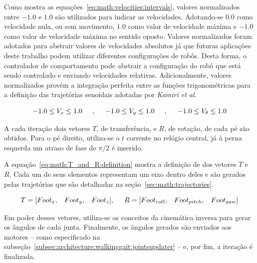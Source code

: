 Como mostra as equações~\ref{eq:math:velocities:intervals}, valores normalizados entre $-1.0$ e $1.0$ são utilizados para indicar as velocidades. Adotando-se $0.0$ como velocidade nula, ou sem movimento, $1.0$ como valor de velocidade máxima e $-1.0$ como valor de velocidade máxima no sentido oposto. Valores normalizados foram adotados para abstrair valores de velocidades absolutos já que futuras aplicações deste trabalho podem utilizar diferentes configurações de robôs. Desta forma, o controlador de comportamento pode abstrair a configuração do robô que está sendo controlado e enviando velocidades relativas. Adicionalmente, valores normalizados provém a integração perfeita entre as funções trigonométricas para a definição das trajetórias senoidais adotadas por \textit{Kamiri et al}.

\begin{equation}
\label{eq:math:velocities:intervals}
-1.0 \leq V_x \leq 1.0
\hspace{5mm},\hspace{5mm}
-1.0 \leq V_y \leq 1.0
\hspace{5mm},\hspace{5mm}
-1.0 \leq V_\theta \leq 1.0
\end{equation}

A cada iteração dois vetores $T$, de transferência, e $R$, de rotação, de cada pé são obtidos. Para o pé direito, utiliza-se o $t$ corrente no relógio central, já à perna esquerda um atraso de fase de $\pi/2$ é inserido.

A equação~\ref{eq:math:T_and_R:definition} mostra a definição de dos vetores $T$ e $R$. Cada um de seus elementos representam um eixo dentro deles e são gerados pelas trajetórias que são detalhadas na seção~\ref{sec:math:trajectories}.

\begin{equation}
\label{eq:math:T_and_R:definition}
T = [Foot_x,\hspace{3mm}Foot_y,\hspace{3mm}Foot_z],\hspace{5mm}R = [Foot_{roll},\hspace{3mm}Foot_{pitch},\hspace{3mm}Foot_{yaw}]
\end{equation}

Em poder desses vetores, utiliza-se os conceitos da cinemática inversa para gerar os ângulos de cada junta. Finalmente, os ângulos gerados são enviados aos motores -- como especificado na subseção~\ref{subsec:architecture:walkinggait:jointsupdater} -- e, por fim, a iteração é finalizada.


